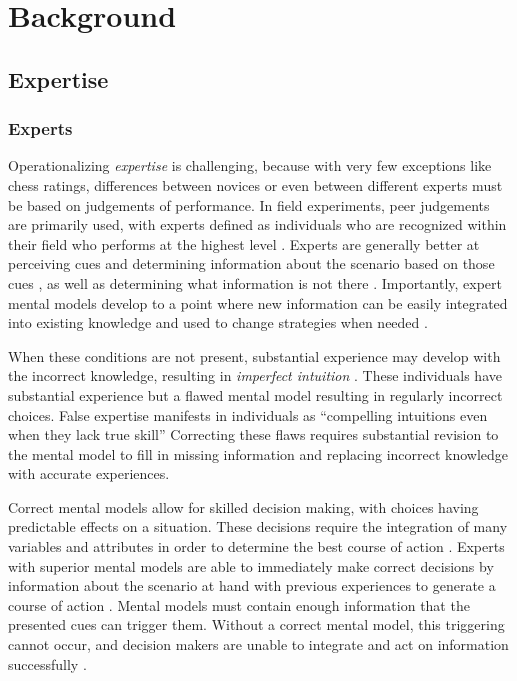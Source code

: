 
\chapter{Background}

\section{Expertise}

\subsection{Experts}

Operationalizing \emph{expertise} is challenging, because with very few exceptions like chess ratings, differences between novices or even between different experts must be based on judgements of performance. In field experiments, peer judgements are primarily used, with experts defined as individuals who are recognized within their field who performs at the highest level \citep{Kahneman2009}. Experts are generally better at perceiving cues and determining information about the scenario based on those cues \citep{Nee2006, Klein1999}, as well as determining what information is not there \citep{Klein1992}. Importantly, expert mental models develop to a point where new information can be easily integrated into existing knowledge and used to change strategies when needed \citep{Glaser1996}.

When these conditions are not present, substantial experience may develop with the incorrect knowledge, resulting in \emph{imperfect intuition} \citep{Kahneman2009}. These individuals have substantial experience but a flawed mental model resulting in regularly incorrect choices. False expertise manifests in individuals as ``compelling intuitions even when they lack true skill'' \citep{Kahneman2009} Correcting these flaws requires substantial revision to the mental model \citep{Klein2006, Chi2008} to fill in missing information and replacing incorrect knowledge with accurate experiences.

Correct mental models allow for skilled decision making, with choices having predictable effects on a situation. These decisions require the integration of many variables and attributes in order to determine the best course of action \citep{Klein2008}. Experts with superior mental models are able to immediately make correct decisions \citep{Klein1992} by information about the scenario at hand with previous experiences to generate a course of action \citep{Klein1999}. Mental models must contain enough information that the presented cues can trigger them. Without a correct mental model, this triggering cannot occur, and decision makers are unable to integrate and act on information successfully \citep{Lipshitz1997}.

